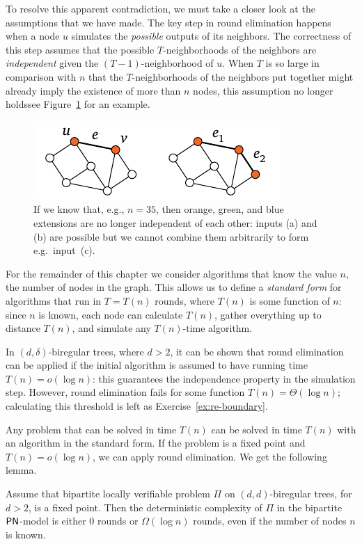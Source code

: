 To resolve this apparent contradiction, we must take a closer look at the assumptions that we have made. The key step in round elimination happens when a node $u$ simulates the \emph{possible} outputs of its neighbors. The correctness of this step assumes that the possible $T$-neighborhoods of the neighbors are \emph{independent} given the $(T-1)$-neighborhood of $u$. When $T$ is so large in comparison with $n$ that the $T$-neighborhoods of the neighbors put together might already imply the existence of more than $n$ nodes, this assumption no longer holds\mydash see Figure~\ref{fig:full-tree} for an example.

\begin{figure}
	\centering
	\includegraphics[page=\PSOFullTree,scale=0.3]{figs.pdf}
	\caption{If we know that, e.g., $n = 35$, then orange, green, and blue extensions are no longer independent of each other: inputs (a) and (b) are possible but we cannot combine them arbitrarily to form e.g.\ input~(c).} \label{fig:full-tree}
\end{figure}

For the remainder of this chapter we consider algorithms that know the value $n$, the number of nodes in the graph. This allows us to define a \emph{standard form} for algorithms that run in $T = T(n)$ rounds, where $T(n)$ is some function of $n$: since $n$ is known, each node can calculate $T(n)$, gather everything up to distance $T(n)$, and simulate any $T(n)$-time algorithm.

In $(d,\delta)$-biregular trees, where $d > 2$, it can be shown that round elimination can be applied if the initial algorithm is assumed to have running time $T(n) = o(\log n)$: this guarantees the independence property in the simulation step. However, round elimination fails for some function $T(n) = \Theta(\log n)$; calculating this threshold is left as Exercise~\ref{ex:re-boundary}. 

Any problem that can be solved in time $T(n)$ can be solved in time $T(n)$ with an algorithm in the standard form. If the problem is a fixed point and $T(n) = o(\log n)$, we can apply round elimination. We get the following lemma.

\begin{lemma}
	Assume that bipartite locally verifiable problem $\Pi$ on $(d,d)$-biregular trees, for $d>2$, is a fixed point. Then the deterministic complexity of $\Pi$ in the bipartite $\textup{\sffamily PN}$-model is either $0$ rounds or $\Omega(\log n)$ rounds, even if the number of nodes $n$ is known.
\end{lemma}

